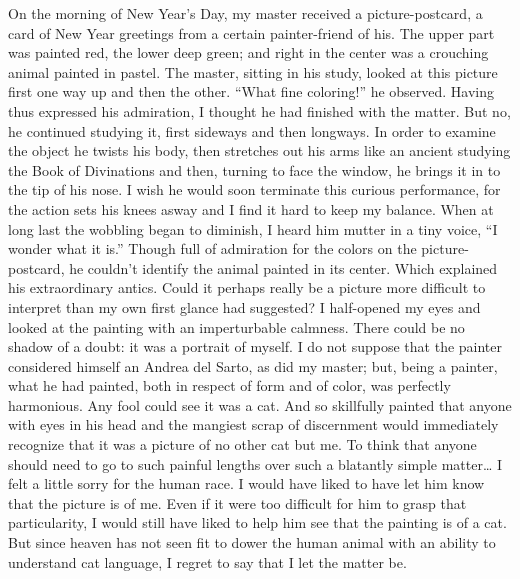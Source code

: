 \documentclass[12pt, openright]{book}
\begin{document}
On the morning of New Year's Day, my master received a picture-postcard,
a card of New Year greetings from a certain painter-friend of his. The
upper part was painted red, the lower deep green; and right in the
center was a crouching animal painted in pastel. The master, sitting in
his study, looked at this picture first one way up and then the other.
``What fine coloring!'' he observed. Having thus expressed his
admiration, I thought he had finished with the matter. But no, he
continued studying it, first sideways and then longways. In order to
examine the object he twists his body, then stretches out his arms like
an ancient studying the Book of Divinations and then, turning to face
the window, he brings it in to the tip of his nose. I wish he would soon
terminate this curious performance, for the action sets his knees asway
and I find it hard to keep my balance. When at long last the wobbling
began to diminish, I heard him mutter in a tiny voice, ``I wonder what
it is.'' Though full of admiration for the colors on the
picture-postcard, he couldn't identify the animal painted in its center.
Which explained his extraordinary antics. Could it perhaps really be a
picture more difficult to interpret than my own first glance had
suggested? I half-opened my eyes and looked at the painting with an
imperturbable calmness. There could be no shadow of a doubt: it was a
portrait of myself. I do not suppose that the painter considered himself
an Andrea del Sarto, as did my master; but, being a painter, what he had
painted, both in respect of form and of color, was perfectly harmonious.
Any fool could see it was a cat. And so skillfully painted that anyone
with eyes in his head and the mangiest scrap of discernment would
immediately recognize that it was a picture of no other cat but me. To
think that anyone should need to go to such painful lengths over such a
blatantly simple matter\ldots{} I felt a little sorry for the human
race. I would have liked to have let him know that the picture is of me.
Even if it were too difficult for him to grasp that particularity, I
would still have liked to help him see that the painting is of a cat.
But since heaven has not seen fit to dower the human animal with an
ability to understand cat language, I regret to say that I let the
matter be.
\end{document}
